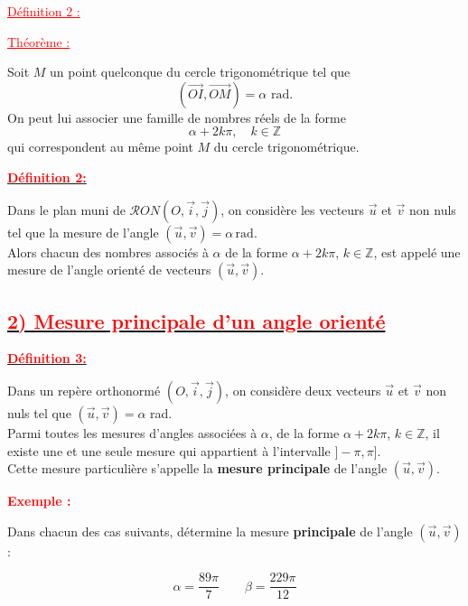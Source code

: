 \documentclass[a4paper,12pt]{article}
\begin{document}
\vspace{1em}

\noindent
\textcolor{red}{\underline{Définition 2 :}} \

\textcolor{red}{\underline{Théorème :}}

\vspace{0.5em}

Soit \( M \) un point quelconque du cercle trigonométrique tel que 
\[
(\overrightarrow{OI}, \overrightarrow{OM}) = \alpha \text{ rad}.
\]
On peut lui associer une famille de nombres réels de la forme 
\[
\alpha + 2k\pi, \quad k \in \mathbb{Z}
\]
qui correspondent au même point \( M \) du cercle trigonométrique.

\vspace{1em}
\noindent\textbf{\underline{\textcolor{red}{Définition 2:}}}
 
Dans le plan muni de \( \mathcal{R}ON(O, \vec{i}, \vec{j}) \), on considère les vecteurs \( \vec{u} \) et \( \vec{v} \) non nuls tel que la mesure de l’angle \( (\vec{u}, \vec{v}) = \alpha \, \text{rad} \).\\
Alors chacun des nombres associés à \( \alpha \) de la forme \( \alpha + 2k\pi \), \( k \in \mathbb{Z} \), est appelé une mesure de l’angle orienté de vecteurs \( (\vec{u}, \vec{v}) \).
\subsection*{\underline{\textcolor{red}{2) Mesure principale d’un angle orienté}}}

\textbf{\underline{\textcolor{red}{Définition 3:}}}

Dans un repère orthonormé \( (O, \vec{i}, \vec{j}) \), on considère deux vecteurs \( \vec{u} \) et \( \vec{v} \) non nuls tel que \( (\vec{u}, \vec{v}) = \alpha \) rad.\\
Parmi toutes les mesures d’angles associées à \( \alpha \), de la forme \( \alpha + 2k\pi \), \( k \in \mathbb{Z} \), il existe une et une seule mesure qui appartient à l’intervalle \( ]-\pi, \pi] \).\\
Cette mesure particulière s’appelle la \textbf{mesure principale} de l’angle \( (\vec{u}, \vec{v}) \).

\vspace{1em}

\textcolor{red}{\textbf{Exemple :}} 

Dans chacun des cas suivants, détermine la mesure \textbf{principale} de l’angle \( (\vec{u}, \vec{v}) \) :

\[
\alpha = \dfrac{89\pi}{7} \qquad \beta = \dfrac{229\pi}{12}
\]
\end{document}
